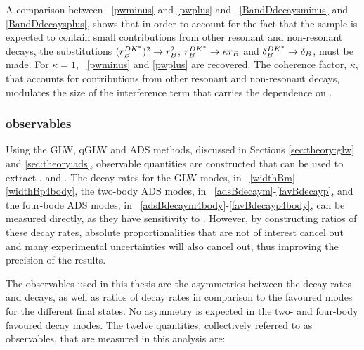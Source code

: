 A comparison between \eqn~\ref{pwminus} and \ref{pwplus} and \eqn~\ref{BandDdecaysminus} and \ref{BandDdecaysplus}, shows that in order to account for the fact that the \decay{\Bm}{\D\Kstarm} sample is expected to contain small contributions from other resonant and non-resonant \decay{\Bm}{\D\KS\pim} decays, the substitutions $(r_B^{DK^*})^2 \rightarrow r_B^2$, $r_B^{DK^*} \rightarrow \kappa r_B$ and $\delta_B^{DK^*} \rightarrow \delta_B$, must be made. For $\kappa = 1$, \eqn~\ref{pwminus} and \ref{pwplus} are recovered. The coherence factor, $\kappa$, that accounts for contributions from other resonant and non-resonant \decay{\Bm}{\D\KS\pim} decays, modulates the size of the interference term that carries the dependence on \Pgamma.

\subsubsection{\CP observables}
\label{sec:theory:observables}

Using the GLW, qGLW and ADS methods, discussed in Sections \ref{sec:theory:glw} and \ref{sec:theory:ads}, observable quantities are constructed that can be used to extract \rb, \deltab and \Pgamma. The decay rates for the GLW modes, in \eqn~\ref{widthBm}-\ref{widthBp4body}, the two-body ADS modes, in \eqn~\ref{adsBdecaym}-\ref{favBdecayp}, and the four-bode ADS modes, in \eqn~\ref{adsBdecaym4body}-\ref{favBdecayp4body}, can be measured directly, as they have sensitivity to \Pgamma. However, by constructing ratios of these decay rates, absolute proportionalities that are not of interest cancel out and many experimental uncertainties will also cancel out, thus improving the precision of the results. 

The observables used in this thesis are the asymmetries between the decay rates \Bm and \Bp decays, as well as ratios of decay rates in comparison to the favoured modes for the different \Dz final states. No \CP asymmetry is expected in the two- and four-body favoured \Dz decay modes. The twelve quantities, collectively referred to as \CP observables, that are measured in this analysis are:

